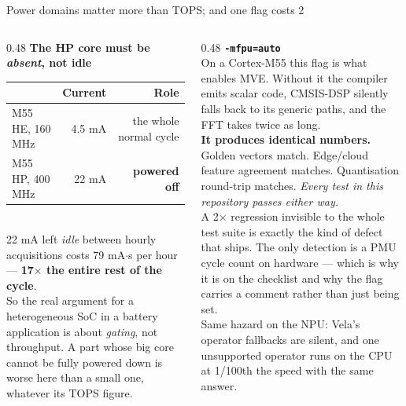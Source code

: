 \documentclass[aspectratio=169,10pt]{beamer}
\begin{document}
\begin{frame}{Power domains matter more than TOPS; and one flag costs 2\texttimes}
  \begin{columns}[T]
    \begin{column}{0.48\textwidth}
      \small\textbf{The HP core must be \emph{absent}, not idle}
      \\[1.5mm]
      \scriptsize
      \begin{tabular}{@{}lrr@{}}
        \toprule
        & \textbf{Current} & \textbf{Role} \\
        \midrule
        M55 HE, 160 MHz & 4.5 mA  & the whole normal cycle \\
        M55 HP, 400 MHz & 22 mA   & \textbf{powered off} \\
        \bottomrule
      \end{tabular}
      \\[2mm]
      22 mA left \emph{idle} between hourly acquisitions costs 79 mA$\cdot$s per
      hour --- \textbf{17$\times$ the entire rest of the cycle}.
      \\[1.5mm]
      So the real argument for a heterogeneous SoC in a battery application is
      about \emph{gating}, not throughput. A part whose big core cannot be fully
      powered down is worse here than a small one, whatever its TOPS figure.
    \end{column}
    \begin{column}{0.48\textwidth}
      \small\textbf{\texttt{-mfpu=auto}}
      \\[1.5mm]
      \scriptsize
      On a Cortex-M55 this flag is what enables MVE. Without it the compiler
      emits scalar code, CMSIS-DSP silently falls back to its generic paths, and
      the FFT takes twice as long.
      \\[1.5mm]
      \textbf{It produces identical numbers.} Golden vectors match. Edge/cloud
      feature agreement matches. Quantisation round-trip matches. \emph{Every
      test in this repository passes either way.}
      \\[1.5mm]
      A 2$\times$ regression invisible to the whole test suite is exactly the
      kind of defect that ships. The only detection is a PMU cycle count on
      hardware --- which is why it is on the checklist and why the flag carries
      a comment rather than just being set.
      \\[1.5mm]
      Same hazard on the NPU: Vela's operator fallbacks are silent, and one
      unsupported operator runs on the CPU at 1/100th the speed with the same
      answer.
    \end{column}
  \end{columns}
\end{frame}
\end{document}
